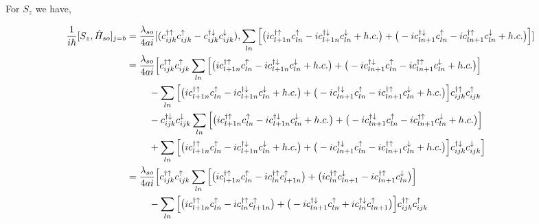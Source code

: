 \documentclass[10pt,prb,showpacs,amssymb,floatfix]{revtex4-1}
\newcommand{\dg}{\dagger}
\newcommand{\dna}{\downarrow}
\newcommand{\nn}{\nonumber}
\newcommand{\upa}{\uparrow}
\newcommand{\lam}{\lambda}
\newcommand{\h}{\hat}
\begin{document}
For $S_z$ we have,

\begin{align}
\frac{1}{i\hbar}[S_z, \h H_{so}]_{j=b} &= \frac{\lam_{so}}{4ai}[(c_{ijk}^{\dg\upa} c_{ijk}^{\upa} - c_{ijk}^{\dg\dna} c_{ijk}^{\dna}), \sum_{ln}  \Big{[} \big{(}i c_{l+1n}^{\dagger \uparrow} c_{l n}^\uparrow  - i c_{l+1n}^{\dagger \downarrow} c_{ln}^\downarrow + h.c. \big{)} +  \big{(} -i c_{l n+1}^{\dagger \downarrow}  c_{l n}^\uparrow  - i c_{ln+1}^{\dagger \uparrow}  c_{ln}^\downarrow + h.c. \big{)}  \Big{]} ] \nn\\
&= \frac{\lambda_{so}}{4ai} \Big{[}  c_{ijk}^{\dg\upa} c_{ijk}^{\upa} \sum_{ln}  \Big{[} \big{(}i c_{l+1n}^{\dagger \uparrow} c_{l n}^\uparrow  - i c_{l+1n}^{\dagger \downarrow} c_{ln}^\downarrow + h.c. \big{)} +  \big{(} -i c_{l n+1}^{\dagger \downarrow}  c_{l n}^\uparrow  - i c_{ln+1}^{\dagger \uparrow}  c_{ln}^\downarrow + h.c. \big{)}  \Big{]} \nn\\
& ~~~~~~~ - \sum_{ln}  \Big{[} \big{(}i c_{l+1n}^{\dagger \uparrow} c_{l n}^\uparrow  - i c_{l+1n}^{\dagger \downarrow} c_{ln}^\downarrow + h.c. \big{)} +  \big{(} -i c_{l n+1}^{\dagger \downarrow}  c_{l n}^\uparrow  - i c_{ln+1}^{\dagger \uparrow}  c_{ln}^\downarrow + h.c. \big{)}  \Big{]}  c_{ijk}^{\dg\upa} c_{ijk}^{\upa} \nn\\
& ~~~~~~~ - c_{ijk}^{\dg\dna} c_{ijk}^{\dna}  \sum_{ln}  \Big{[} \big{(}i c_{l+1n}^{\dagger \uparrow} c_{l n}^\uparrow  - i c_{l+1n}^{\dagger \downarrow} c_{ln}^\downarrow + h.c. \big{)} +  \big{(} -i c_{l n+1}^{\dagger \downarrow}  c_{l n}^\uparrow  - i c_{ln+1}^{\dagger \uparrow}  c_{ln}^\downarrow + h.c. \big{)}  \Big{]} \nn\\
& ~~~~~~~  + \sum_{ln}  \Big{[} \big{(}i c_{l+1n}^{\dagger \uparrow} c_{l n}^\uparrow  - i c_{l+1n}^{\dagger \downarrow} c_{ln}^\downarrow + h.c. \big{)} +  \big{(} -i c_{l n+1}^{\dagger \downarrow}  c_{l n}^\uparrow  - i c_{ln+1}^{\dagger \uparrow}  c_{ln}^\downarrow + h.c. \big{)}  \Big{]}  c_{ijk}^{\dg\dna} c_{ijk}^{\dna}  \Big{]} \nn\\
&= \frac{\lambda_{so}}{4ai} \Big{[}  c_{ijk}^{\dg\upa} c_{ijk}^{\upa} \sum_{ln}  \Big{[} \big{(}i c_{l+1n}^{\dagger \uparrow} c_{l n}^\uparrow - i c_{l n}^{\dagger \uparrow} c_{l+1n}^{\uparrow}    \big{)} +  \big{(} i c_{l n}^{\dagger \uparrow} c_{l n+1}^{ \downarrow}    - i c_{ln+1}^{\dagger \uparrow}  c_{ln}^\downarrow \big{)}  \Big{]} \nn\\
& ~~~~~~~ - \sum_{ln}  \Big{[} \big{(}i c_{l+1n}^{\dagger \uparrow} c_{l n}^\uparrow - i c_{l n}^{\dagger \uparrow} c_{l+1n}^{ \uparrow}  \big{)} +  \big{(} -i c_{l n+1}^{\dagger \downarrow}  c_{l n}^\uparrow  + i c_{ln}^{\dagger \downarrow} c_{ln+1}^{\uparrow}  \big{)}  \Big{]}  c_{ijk}^{\dg\upa} c_{ijk}^{\upa} \nn\\

\end{align}
\end{document}
